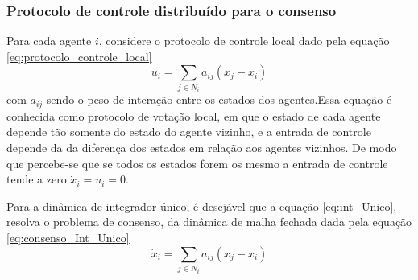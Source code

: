 \subsubsection{Protocolo de controle distribuído para o consenso}
Para cada agente $i$, considere o protocolo de controle local dado pela equação \ref{eq:protocolo_controle_local}
\begin{equation}\label{eq:protocolo_controle_local}
    u_{i} = \sum\limits_{j \in N_{i}} a_{ij} (x_{j} - x_{i})
\end{equation}
com $a_{ij}$ sendo o peso de interação entre os estados dos agentes.Essa equação é conhecida como protocolo de votação local, em que o estado de cada agente depende tão somente do estado do agente vizinho, e a entrada de controle depende da da diferença dos estados em relação aos agentes vizinhos. De modo que percebe-se que se todos os estados forem os mesmo a entrada de controle tende a zero $\dot x_{i} = u_{i} = 0$.

Para a dinâmica de integrador único, é desejável que a equação \ref{eq:int_Unico}, resolva o problema de consenso, da dinâmica de malha fechada dada pela equação \ref{eq:consenso_Int_Unico}
\begin{equation}\label{eq:consenso_Int_Unico}
    \dot x_{i} = \sum\limits_{j \in N_{i}} a_{ij} (x_{j} - x_{i})
\end{equation}

